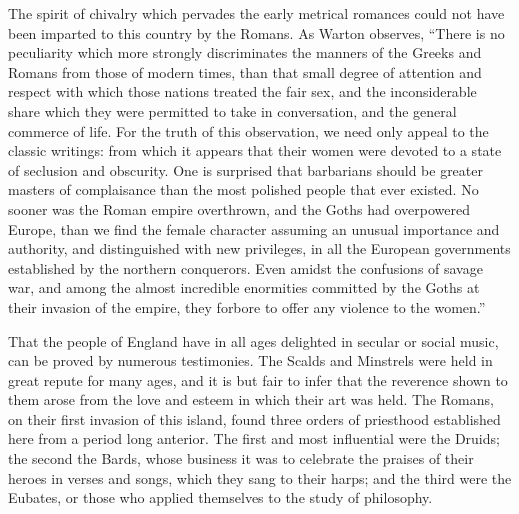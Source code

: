 The spirit of chivalry which pervades the early metrical romances could not
have been imparted to this country by the Romans. As Warton observes,
“There is no peculiarity which more strongly discriminates the manners of the
Greeks and Romans from those of modern times, than that small degree of attention
and respect with which those nations treated the fair sex, and the inconsiderable
share which they were permitted to take in conversation, and the general
commerce of life. For the truth of this observation, we need only appeal to the
classic writings: from which it appears that their women were devoted to a state
of seclusion and obscurity. One is surprised that barbarians should be greater
masters of complaisance than the most polished people that ever existed. No
sooner was the Roman empire overthrown, and the Goths had overpowered
Europe, than we find the female character assuming an unusual importance and
authority, and distinguished with new privileges, in all the European governments
established by the northern conquerors. Even amidst the confusions of
savage war, and among the almost incredible enormities committed by the Goths
at their invasion of the empire, they forbore to offer any violence to the women.”

That the people of England have in all ages delighted in secular or social
music, can be proved by numerous testimonies. The Scalds and Minstrels were
held in great repute for many ages, and it is but fair to infer that the reverence
shown to them arose from the love and esteem in which their art was held. The
Romans, on their first invasion of this island, found three orders of priesthood
established here from a period long anterior. The first and most influential were
the Druids; the second the Bards, whose business it was to celebrate the praises
of their heroes in verses and songs, which they sang to their harps; and the third
were the Eubates, or those who applied themselves to the study of philosophy.



